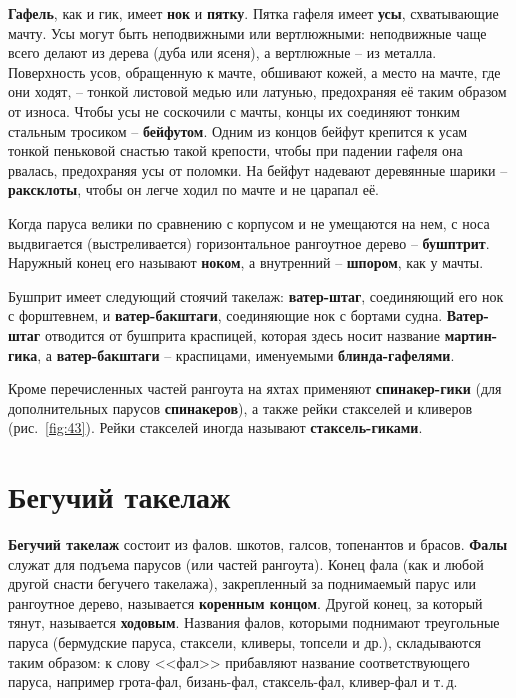 \documentclass[a4paper, 12pt, twoside, final]{scrbook}
\begin{document}
\textbf{Гафель}, как и гик, имеет \textbf{нок} и \textbf{пятку}. Пятка гафеля имеет
\textbf{усы}, схватывающие мачту. Усы могут быть неподвижными или
вертлюжными: неподвижные чаще всего делают из дерева (дуба или ясеня),
а вертлюжные \--- из металла. Поверхность усов, обращенную к мачте, обшивают
кожей, а место на мачте, где они ходят, \--- тонкой листовой медью или
латунью, предохраняя её таким образом от износа. Чтобы усы не соскочили
с мачты, концы их соединяют тонким стальным тросиком \--- \textbf{бейфутом}.
Одним из концов бейфут крепится к усам тонкой пеньковой снастью такой
крепости, чтобы при падении гафеля она рвалась, предохраняя усы от
поломки. На бейфут надевают деревянные шарики \--- \textbf{раксклоты},
чтобы он легче ходил по мачте и не царапал её.

Когда паруса велики по сравнению с корпусом и не умещаются на нем,
с носа выдвигается (выстреливается) горизонтальное рангоутное дерево
\--- \textbf{бушптрит}. Наружный конец его называют \textbf{ноком}, а внутренний
\--- \textbf{шпором}, как у мачты.

Бушприт имеет следующий стоячий такелаж: \textbf{ватер-штаг}, соединяющий его
нок с форштевнем, и \textbf{ватер-бакштаги}, соединяющие нок с бортами судна.
\textbf{Ватер-штаг} отводится от бушприта краспицей, которая здесь носит название
\textbf{мартин-гика}, а \textbf{ватер-бакштаги} \--- краспицами, именуемыми
\textbf{блинда-гафелями}.

Кроме перечисленных частей рангоута на яхтах применяют \textbf{спинакер-гики}
(для дополнительных парусов \textbf{спинакеров}), а также рейки стакселей и
кливеров (рис.~\ref{fig:43}).
Рейки стакселей иногда называют \textbf{стаксель-гиками}.

%
%

\section{Бегучий такелаж}

\textbf{Бегучий такелаж} состоит из фалов. шкотов, галсов, топенантов и брасов.
\textbf{Фалы} служат для подъема парусов (или частей рангоута). Конец
фала (как и любой другой снасти бегучего такелажа), закрепленный за
поднимаемый парус или рангоутное дерево, называется \textbf{коренным
концом}. Другой конец, за который тянут, называется \textbf{ходовым}.
Названия фалов, которыми поднимают треугольные паруса (бермудские
паруса, стаксели, кливеры, топсели и др.), складываются таким образом:
к слову <<фал>> прибавляют название соответствующего паруса, например
грота-фал, бизань-фал, стаксель-фал, кливер-фал и т.\,д.
\end{document}

